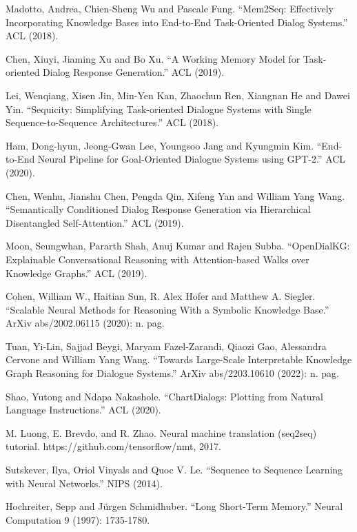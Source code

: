 \documentclass[11pt,dvipdfm]{article}
\begin{document}
\begin{thebibliography}{10}
\begin{small}
 Madotto, Andrea, Chien-Sheng Wu and Pascale Fung. “Mem2Seq: Effectively Incorporating Knowledge Bases into End-to-End Task-Oriented Dialog Systems.” ACL (2018).

 Chen, Xiuyi, Jiaming Xu and Bo Xu. “A Working Memory Model for Task-oriented Dialog Response Generation.” ACL (2019).

 Lei, Wenqiang, Xisen Jin, Min-Yen Kan, Zhaochun Ren, Xiangnan He and Dawei Yin. “Sequicity: Simplifying Task-oriented Dialogue Systems with Single Sequence-to-Sequence Architectures.” ACL (2018).

 Ham, Dong-hyun, Jeong-Gwan Lee, Youngsoo Jang and Kyungmin Kim. “End-to-End Neural Pipeline for Goal-Oriented Dialogue Systems using GPT-2.” ACL (2020).

 Chen, Wenhu, Jianshu Chen, Pengda Qin, Xifeng Yan and William Yang Wang. “Semantically Conditioned Dialog Response Generation via Hierarchical Disentangled Self-Attention.” ACL (2019).

 Moon, Seungwhan, Pararth Shah, Anuj Kumar and Rajen Subba. “OpenDialKG: Explainable Conversational Reasoning with Attention-based Walks over Knowledge Graphs.” ACL (2019).

 Cohen, William W., Haitian Sun, R. Alex Hofer and Matthew A. Siegler. “Scalable Neural Methods for Reasoning With a Symbolic Knowledge Base.” ArXiv abs/2002.06115 (2020): n. pag.

 Tuan, Yi-Lin, Sajjad Beygi, Maryam Fazel-Zarandi, Qiaozi Gao, Alessandra Cervone and William Yang Wang. “Towards Large-Scale Interpretable Knowledge Graph Reasoning for Dialogue Systems.” ArXiv abs/2203.10610 (2022): n. pag.

 Shao, Yutong and Ndapa Nakashole. “ChartDialogs: Plotting from Natural Language Instructions.” ACL (2020).

 M. Luong, E. Brevdo, and R. Zhao. Neural machine translation (seq2seq) tutorial. https://github.com/tensorflow/nmt, 2017.

 Sutskever, Ilya, Oriol Vinyals and Quoc V. Le. “Sequence to Sequence Learning with Neural Networks.” NIPS (2014).

 Hochreiter, Sepp and Jürgen Schmidhuber. “Long Short-Term Memory.” Neural Computation 9 (1997): 1735-1780.


\end{small}
\end{thebibliography}
\end{document}
